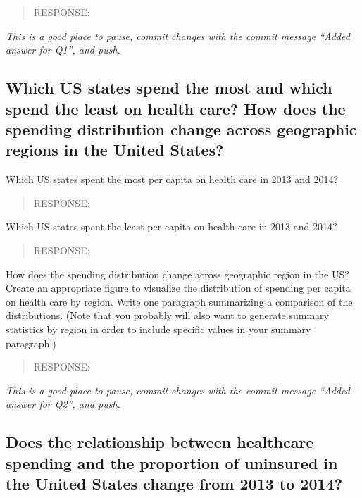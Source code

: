 \documentclass[
]{article}
\begin{document}
\begin{quote}
RESPONSE:
\end{quote}

\emph{This is a good place to pause, commit changes with the commit
message ``Added answer for Q1'', and push.}

\hypertarget{which-us-states-spend-the-most-and-which-spend-the-least-on-health-care-how-does-the-spending-distribution-change-across-geographic-regions-in-the-united-states}{%
\subsection{Which US states spend the most and which spend the least on
health care? How does the spending distribution change across geographic
regions in the United
States?}\label{which-us-states-spend-the-most-and-which-spend-the-least-on-health-care-how-does-the-spending-distribution-change-across-geographic-regions-in-the-united-states}}

Which US states spent the most per capita on health care in 2013 and
2014?

\begin{quote}
RESPONSE:
\end{quote}

Which US states spent the least per capita on health care in 2013 and
2014?

\begin{quote}
RESPONSE:
\end{quote}

How does the spending distribution change across geographic region in
the US? Create an appropriate figure to visualize the distribution of
spending per capita on health care by region. Write one paragraph
summarizing a comparison of the distributions. (Note that you probably
will also want to generate summary statistics by region in order to
include specific values in your summary paragraph.)

\begin{quote}
RESPONSE:
\end{quote}

\emph{This is a good place to pause, commit changes with the commit
message ``Added answer for Q2'', and push.}

\hypertarget{does-the-relationship-between-healthcare-spending-and-the-proportion-of-uninsured-in-the-united-states-change-from-2013-to-2014}{%
\subsection{Does the relationship between healthcare spending and the
proportion of uninsured in the United States change from 2013 to
2014?}\label{does-the-relationship-between-healthcare-spending-and-the-proportion-of-uninsured-in-the-united-states-change-from-2013-to-2014}}
\end{document}
